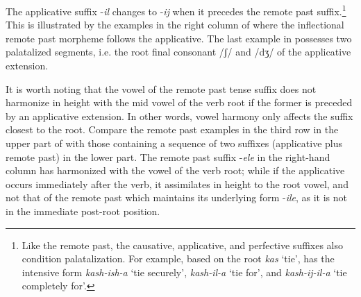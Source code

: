 \documentclass[output=paper]{langsci/langscibook}
\begin{document}
The applicative suffix -\textit{il} changes to -\textit{ij} when it precedes the remote past suffix.\footnote{Like the remote past, the causative, applicative, and perfective suffixes also condition palatalization. For example, based on the root \textit{kas} ‘tie’,  has the intensive form \textit{kash-ish-a} ‘tie securely’, \textit{kash-il-a} ‘tie for’, and \textit{kash-ij-il-a} ‘tie completely for’.} This is illustrated by the examples in the right column of  where the inflectional remote past morpheme follows the applicative. The last example in  possesses two palatalized segments, i.e. the root final consonant /ʃ/ and /dʒ/ of the applicative extension. 


\begin{table}

\caption{Voiced palatalization of applicative /l/}
\label{tab:13.kawasha}
\end{table}

It is worth noting that the vowel of the remote past tense suffix does not harmonize in height with the mid vowel of the verb root if the former is preceded by an applicative extension. In other words, vowel harmony only affects the suffix closest to the root. Compare the remote past examples in the third row in the upper part of  with those containing a sequence of two suffixes (applicative plus remote past) in the lower part. The remote past suffix -\textit{ele} in the right-hand column has harmonized with the vowel of the verb root; while if the applicative occurs immediately after the verb, it assimilates in height to the root  vowel, and not that of the remote past which maintains its underlying form -\textit{ile}, as it is not in the immediate post-root position.
 
\end{document}
